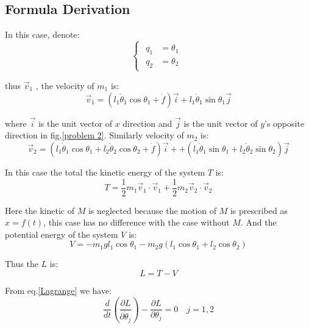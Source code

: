 \subsection{Formula Derivation}

In this case, denote:
\begin{equation}
    \begin{cases}
        \begin{aligned}
            q_1&=\theta_1\\
            q_2&=\theta_2
        \end{aligned}
    \end{cases}
\end{equation}

thus $\vec{v}_1$ , the velocity of $m_1$ is:
\begin{equation}
    \vec{v}_1=
    (l_1 \dot{\theta}_1 \cos \theta_1 + \dot{f})\vec{i}
    +
    l_1 \dot{\theta}_1 \sin\theta_1 \vec{j}
\end{equation}

where $\vec{i}$ is the unit vector of $x$ direction and $\vec{j}$ is the unit vector of $y$'s opposite direction in fig.\ref{problem 2}.
Similarly velocity of $m_2$ is:
\begin{equation}
    \vec{v}_2=
    (l_1 \dot{\theta}_1 \cos \theta_1 + l_2 \dot{\theta}_2 \cos \theta_2 + \dot{f})\vec{i}
    +
    +
    (l_1 \dot{\theta}_1 \sin\theta_1 + l_2 \dot{\theta}_2 \sin\theta_2)\vec{j}
\end{equation}

In this case the total the kinetic energy of the system $T$ is:
\begin{equation}
    T=\frac{1}{2}m_1\vec{v}_1\cdot\vec{v}_1
    +
    \frac{1}{2}m_2\vec{v}_2\cdot\vec{v}_2
\end{equation}

Here the kinetic of $M$ is neglected because the motion of $M$ is prescribed as $x=f(t)$, 
this case has no difference with the case without $M$. 
And the potential energy of the system $V$ is:
\begin{equation}
    V = -m_1 g l_1 \cos\theta_1 - m_2 g (l_1\cos\theta_1 + l_2\cos\theta_2) 
\end{equation}

Thus the $L$ is:
\begin{equation}
    L=T-V
\end{equation}

From eq.\ref{Lagrange} we have:
\begin{equation}
        \frac{d}{dt}
        \left(
        \frac{\partial L}{\partial \dot{\theta}_j}
        \right)
        -
        \frac{\partial L}{\partial \theta_j}=0\quad j=1,2
\end{equation}

